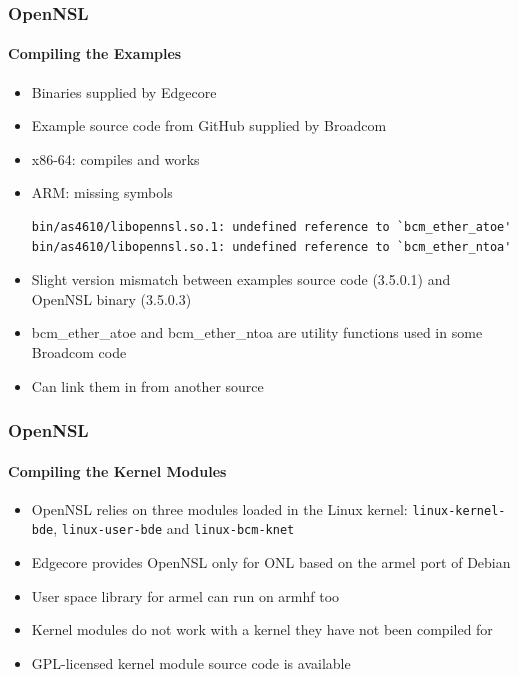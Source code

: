 \documentclass[12pt]{beamer}
\begin{document}
\begin{frame}[fragile]
\frametitle{OpenNSL}
\framesubtitle{Compiling the Examples}
\begin{itemize}
    \item Binaries supplied by Edgecore
    \item Example source code from GitHub supplied by Broadcom
    \pause
    \item x86-64: compiles and works
    \pause
    \item ARM: missing symbols
\begin{lstlisting}
bin/as4610/libopennsl.so.1: undefined reference to `bcm_ether_atoe'
bin/as4610/libopennsl.so.1: undefined reference to `bcm_ether_ntoa'
\end{lstlisting}
    \item Slight version mismatch between examples source code (3.5.0.1) and OpenNSL binary (3.5.0.3)
    \item bcm\_ether\_atoe and bcm\_ether\_ntoa are utility functions used in some Broadcom code
    \item Can link them in from another source
\end{itemize}
\end{frame}

\begin{frame}
\frametitle{OpenNSL}
\framesubtitle{Compiling the Kernel Modules}
\begin{itemize}
    \item OpenNSL relies on three modules loaded in the Linux kernel: \texttt{linux-kernel-bde}, \texttt{linux-user-bde} and \texttt{linux-bcm-knet}
    \item Edgecore provides OpenNSL only for ONL based on the armel port of Debian
    \item User space library for armel can run on armhf too
    \item Kernel modules do not work with a kernel they have not been compiled for
    \item GPL-licensed kernel module source code is available
\end{itemize}
\end{frame}
\end{document}
